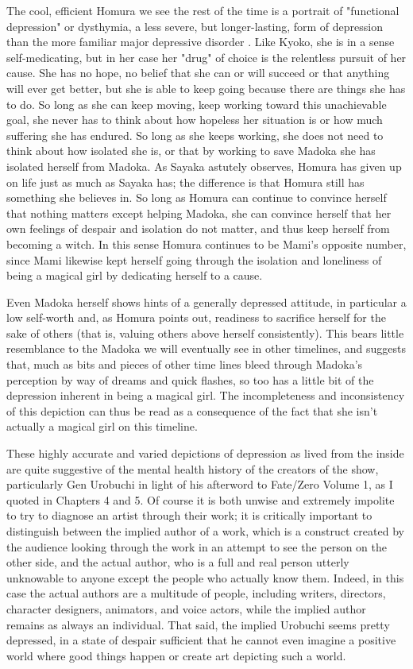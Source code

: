 The cool, efficient Homura we see the rest of the time is a portrait of "functional depression" or dysthymia, a less severe, but longer-lasting, form of depression than the more familiar major depressive disorder \cite{ref58}. Like Kyoko, she is in a sense self-medicating, but in her case her "drug" of choice is the relentless pursuit of her cause. She has no hope, no belief that she can or will succeed or that anything will ever get better, but she is able to keep going because there are things she has to do. So long as she can keep moving, keep working toward this unachievable goal, she never has to think about how hopeless her situation is or how much suffering she has endured. So long as she keeps working, she does not need to think about how isolated she is, or that by working to save Madoka she has isolated herself from Madoka. As Sayaka astutely observes, Homura has given up on life just as much as Sayaka has; the difference is that Homura still has something she believes in. So long as Homura can continue to convince herself that nothing matters except helping Madoka, she can convince herself that her own feelings of despair and isolation do not matter, and thus keep herself from becoming a witch. In this sense Homura continues to be Mami's opposite number, since Mami likewise kept herself going through the isolation and loneliness of being a magical girl by dedicating herself to a cause.

Even Madoka herself shows hints of a generally depressed attitude, in particular a low self-worth and, as Homura points out, readiness to sacrifice herself for the sake of others (that is, valuing others above herself consistently). This bears little resemblance to the Madoka we will eventually see in other timelines, and suggests that, much as bits and pieces of other time lines bleed through Madoka's perception by way of dreams and quick flashes, so too has a little bit of the depression inherent in being a magical girl. The incompleteness and inconsistency of this depiction can thus be read as a consequence of the fact that she isn't actually a magical girl on this timeline.

These highly accurate and varied depictions of depression as lived from the inside are quite suggestive of the mental health history of the creators of the show, particularly Gen Urobuchi in light of his afterword to Fate/Zero Volume 1, as I quoted in Chapters 4 and 5. Of course it is both unwise and extremely impolite to try to diagnose an artist through their work; it is critically important to distinguish between the implied author of a work, which is a construct created by the audience looking through the work in an attempt to see the person on the other side, and the actual author, who is a full and real person utterly unknowable to anyone except the people who actually know them. Indeed, in this case the actual authors are a multitude of people, including writers, directors, character designers, animators, and voice actors, while the implied author remains as always an individual. That said, the implied Urobuchi seems pretty depressed, in a state of despair sufficient that he cannot even imagine a positive world where good things happen or create art depicting such a world.

